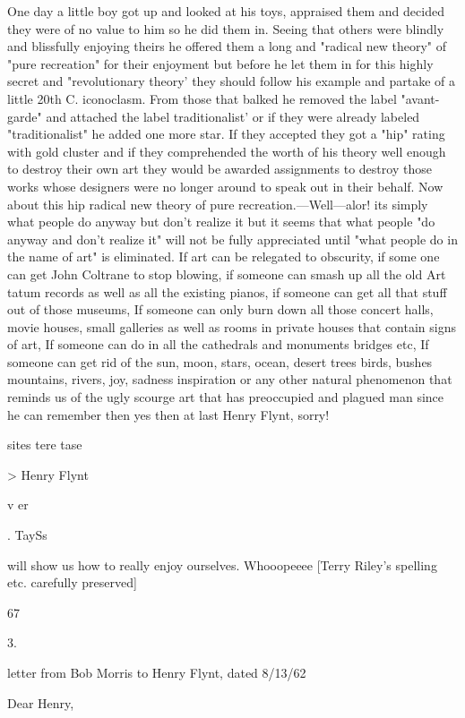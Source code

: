 \documentclass[10pt,twoside]{memoir}
\begin{document}
\begin{enumerate}
{{{{{{{{{{{{{{One day a little boy got up and looked at his toys, appraised them and 
decided they were of no value to him so he did them in. Seeing that others 
were blindly and blissfully enjoying theirs he offered them a long and 
"radical new theory" of "pure recreation" for their enjoyment but before he 
let them in for this highly secret and "revolutionary theory' they should 
follow his example and partake of a little 20th C. iconoclasm. From those 
that balked he removed the label "avant-garde" and attached the label 
traditionalist' or if they were already labeled "traditionalist" he added one 
more star. If they accepted they got a "hip" rating with gold cluster and if 
they comprehended the worth of his theory well enough to destroy their 
own art they would be awarded assignments to destroy those works whose 
designers were no longer around to speak out in their behalf. 
Now about this hip radical new theory of pure recreation.---Well---alor! its 
simply what people do anyway but don't realize it but it seems that what 
people "do anyway and don't realize it" will not be fully appreciated until 
"what people do in the name of art" is eliminated. If art can be relegated to 
obscurity, if some one can get John Coltrane to stop blowing, if someone 
can smash up all the old Art tatum records as well as all the existing pianos, 
if someone can get all that stuff out of those museums, If someone can only 
burn down all those concert halls, movie houses, small galleries as well as 
rooms in private houses that contain signs of art, If someone can do in all the 
cathedrals and monuments bridges etc, If someone can get rid of the sun, 
moon, stars, ocean, desert trees birds, bushes mountains, rivers, joy, sadness 
inspiration or any other natural phenomenon that reminds us of the ugly 
scourge art that has preoccupied and plagued man since he can remember 
then yes then at last Henry Flynt, sorry! 

sites tere tase 


> Henry Flynt 


v 
er 


. 
TaySs 


will show us how to really enjoy ourselves. Whooopeeee 
[Terry Riley's spelling etc. carefully preserved] 


67 


3. 


letter from Bob Morris to Henry Flynt, dated 8/13/62 


Dear Henry, 

}}}}}}}}}}}}}}
\end{enumerate}
\end{document}
